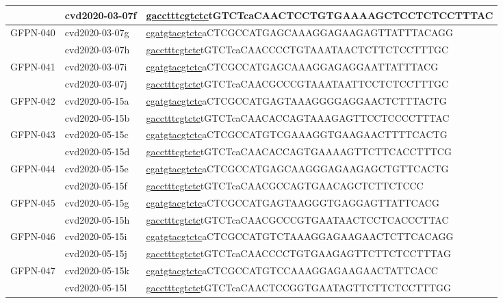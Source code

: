 \begin{landscape}
\begin{longtable}{|l|l|l|}
		& cvd2020-03-07f & \underline{gaccttt\underline{cgtctc}}tGTCTcaCAACTCCTGTGAAAAGCTCCTCTCCTTTAC \\ \hline
		\multirow{2}{*}{GFPN-040} & cvd2020-03-07g & \underline{cgatgta\underline{cgtctc}}aCTCGCCATGAGCAAAGGAGAAGAGTTATTTACAGG  \\ \cline{2-3} 
		& cvd2020-03-07h & \underline{gaccttt\underline{cgtctc}}tGTCTcaCAACCCCTGTAAATAACTCTTCTCCTTTGC \\ \hline
		\multirow{2}{*}{GFPN-041} & cvd2020-03-07i & \underline{cgatgta\underline{cgtctc}}aCTCGCCATGAGCAAAGGAGAGGAATTATTTACG    \\ \cline{2-3} 
		& cvd2020-03-07j & \underline{gaccttt\underline{cgtctc}}tGTCTcaCAACGCCCGTAAATAATTCCTCTCCTTTGC \\ \hline
		\multirow{2}{*}{GFPN-042} & cvd2020-05-15a & \underline{cgatgta\underline{cgtctc}}aCTCGCCATGAGTAAAGGGGAGGAACTCTTTACTG   \\ \cline{2-3} 
		& cvd2020-05-15b & \underline{gaccttt\underline{cgtctc}}tGTCTcaCAACACCAGTAAAGAGTTCCTCCCCTTTAC \\ \hline
		\multirow{2}{*}{GFPN-043} & cvd2020-05-15c & \underline{cgatgta\underline{cgtctc}}aCTCGCCATGTCGAAAGGTGAAGAACTTTTCACTG   \\ \cline{2-3} 
		& cvd2020-05-15d & \underline{gaccttt\underline{cgtctc}}tGTCTcaCAACACCAGTGAAAAGTTCTTCACCTTTCG \\ \hline
		\multirow{2}{*}{GFPN-044} & cvd2020-05-15e & \underline{cgatgta\underline{cgtctc}}aCTCGCCATGAGCAAGGGAGAAGAGCTGTTCACTG   \\ \cline{2-3} 
		& cvd2020-05-15f & \underline{gaccttt\underline{cgtctc}}tGTCTcaCAACGCCAGTGAACAGCTCTTCTCCC     \\ \hline
		\multirow{2}{*}{GFPN-045} & cvd2020-05-15g & \underline{cgatgta\underline{cgtctc}}aCTCGCCATGAGTAAGGGTGAGGAGTTATTCACG    \\ \cline{2-3} 
		& cvd2020-05-15h & \underline{gaccttt\underline{cgtctc}}tGTCTcaCAACGCCCGTGAATAACTCCTCACCCTTAC \\ \hline
		\multirow{2}{*}{GFPN-046} & cvd2020-05-15i & \underline{cgatgta\underline{cgtctc}}aCTCGCCATGTCTAAAGGAGAAGAACTCTTCACAGG  \\ \cline{2-3} 
		& cvd2020-05-15j & \underline{gaccttt\underline{cgtctc}}tGTCTcaCAACCCCTGTGAAGAGTTCTTCTCCTTTAG \\ \hline
		\multirow{2}{*}{GFPN-047} & cvd2020-05-15k & \underline{cgatgta\underline{cgtctc}}aCTCGCCATGTCCAAAGGAGAAGAACTATTCACC    \\ \cline{2-3} 
		& cvd2020-05-15l & \underline{gaccttt\underline{cgtctc}}tGTCTcaCAACTCCGGTGAATAGTTCTTCTCCTTTGG \\ \hline

\end{longtable}
\end{landscape}
